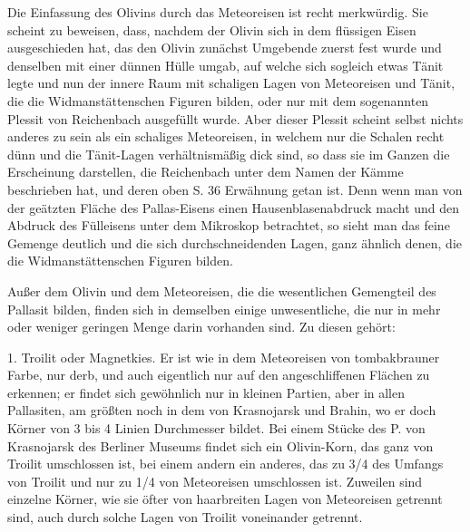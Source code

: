\documentclass[a4paper, 11pt, oneside]{article}
\begin{document}
Die Einfassung des Olivins durch das Meteoreisen ist recht merkwürdig. Sie scheint zu beweisen, dass, nachdem der Olivin sich in dem flüssigen Eisen ausgeschieden hat, das den Olivin zunächst Umgebende zuerst fest wurde und denselben mit einer dünnen Hülle umgab, auf welche sich sogleich etwas Tänit legte und nun der innere Raum mit schaligen Lagen von Meteoreisen und Tänit, die die Widmanstättenschen Figuren bilden, oder nur mit dem sogenannten Plessit von Reichenbach ausgefüllt wurde. Aber dieser Plessit scheint selbst nichts anderes zu sein als ein schaliges Meteoreisen, in welchem nur die Schalen recht dünn und die Tänit-Lagen verhältnismäßig dick sind, so dass sie im Ganzen die Erscheinung darstellen, die Reichenbach unter dem Namen der Kämme beschrieben hat, und deren oben S. 36 Erwähnung getan ist. Denn wenn man von der geätzten Fläche des Pallas-Eisens einen Hausenblasenabdruck macht und den Abdruck des Fülleisens unter dem Mikroskop betrachtet, so sieht man das feine Gemenge deutlich und die sich durchschneidenden Lagen, ganz ähnlich denen, die die Widmanstättenschen Figuren bilden.

Außer dem Olivin und dem Meteoreisen, die die wesentlichen Gemengteil des Pallasit bilden, finden sich in demselben einige unwesentliche, die nur in mehr oder weniger geringen Menge darin vorhanden sind. Zu diesen gehört:

1. Troilit oder Magnetkies. Er ist wie in dem Meteoreisen von tombakbrauner Farbe, nur derb, und auch eigentlich nur auf den angeschliffenen Flächen zu erkennen; er findet sich gewöhnlich nur in kleinen Partien, aber in allen Pallasiten, am größten noch in dem von Krasnojarsk und Brahin, wo er doch Körner von 3 bis 4 Linien Durchmesser bildet. Bei einem Stücke des P. von Krasnojarsk des Berliner Museums findet sich ein Olivin-Korn, das ganz von Troilit umschlossen ist, bei einem andern ein anderes, das zu 3/4 des Umfangs von Troilit und nur zu 1/4 von Meteoreisen umschlossen ist. Zuweilen sind einzelne Körner, wie sie öfter von haarbreiten Lagen von Meteoreisen getrennt sind, auch durch solche Lagen von Troilit voneinander getrennt.
\end{document}
